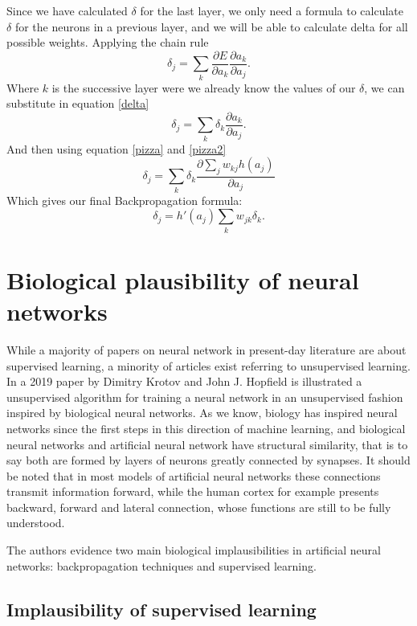 \documentclass[a4paper]{report}
\begin{document}
Since we have calculated $\delta$ for the last layer, we only need a formula to calculate $\delta$ for the neurons in a previous layer, and we will be able to calculate delta for all possible weights.
Applying the chain rule
\begin{equation}
\delta_j = \sum_k \frac{\partial E}{\partial a_k} \frac{\partial a_k}{\partial a_j}.
\end{equation}
Where $k$ is the successive layer were we already know the values of our $\delta$, we can substitute in equation \ref{delta}
\begin{equation}
\delta_j = \sum_k\delta_k \frac{\partial a_k}{\partial a_j}.
\end{equation}
And then using equation \ref{pizza} and \ref{pizza2}
\begin{equation}
\delta_j = \sum_k \delta_k \frac{\partial \sum_j w_{kj} h(a_j)}{\partial a_j}
\end{equation}
Which gives our final Backpropagation formula:
\begin{equation}
\delta_j = h'(a_j)\sum_k w_{jk}\delta_k.
\end{equation}


\section{Biological plausibility of neural networks}
While a majority of papers on neural network in present-day literature are about supervised learning, a minority of articles exist referring to unsupervised learning.
In a 2019 paper by Dimitry Krotov and John J.
Hopfield is illustrated a unsupervised algorithm for training a neural network in an unsupervised fashion inspired by biological neural networks.
As we know, biology has inspired neural networks since the first steps in this direction of machine learning, and biological neural networks and artificial neural network have structural similarity, that is to say both are formed by layers of neurons greatly connected by synapses.
It should be noted that in most models of artificial neural networks these connections transmit information forward, while the human cortex for example presents backward, forward and lateral connection, whose functions are still to be fully understood.

The authors evidence two main biological implausibilities in artificial neural networks:
backpropagation techniques and supervised learning.

\subsection{Implausibility of supervised learning}
\end{document}
